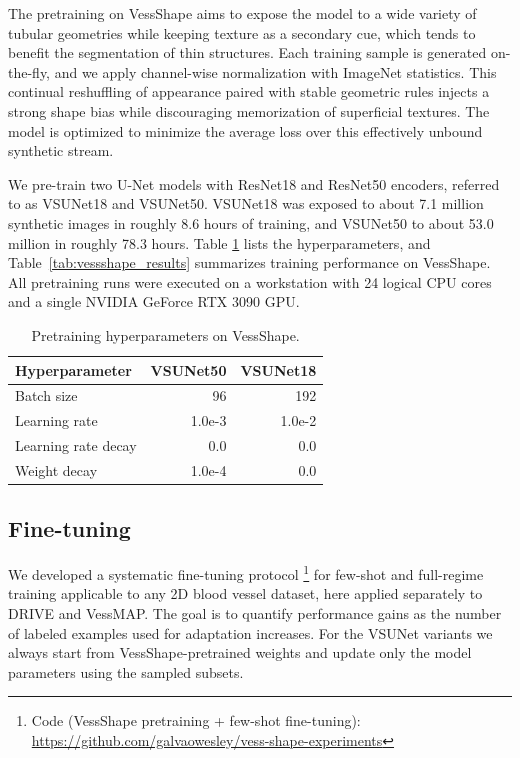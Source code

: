 \documentclass[%
reprint,
nofootinbib,
 amsmath,amssymb,
aps,
superscriptaddress,
showkeys,
longbibliography
]{revtex4-1}
\begin{document}
The pretraining on VessShape aims to expose the model to a wide variety of tubular geometries while keeping texture as a secondary cue, which tends to benefit the segmentation of thin structures. Each training sample is generated on-the-fly, and we apply channel-wise normalization with ImageNet statistics. This continual reshuffling of appearance paired with stable geometric rules injects a strong shape bias while discouraging memorization of superficial textures. The model is optimized to minimize the average loss over this effectively unbound synthetic stream. 

We pre-train two U-Net models with ResNet18 and ResNet50 encoders, referred to as VSUNet18 and VSUNet50. VSUNet18 was exposed to about 7.1 million synthetic images in roughly 8.6 hours of training, and VSUNet50 to about 53.0 million in roughly 78.3 hours. Table \ref{tab:vs_hparams} lists the hyperparameters, and Table~\ref{tab:vessshape_results} summarizes training performance on VessShape. All pretraining runs were executed on a workstation with 24 logical CPU cores and a single NVIDIA GeForce RTX 3090 GPU.

\begin{table}[t]
    \caption{Pretraining hyperparameters on VessShape.}
    \label{tab:vs_hparams}
    \centering
    \begingroup
    \small
    \setlength{\tabcolsep}{6pt}
    \renewcommand{\arraystretch}{1.15}
    \begin{tabular}{l r r}
        \hline
        	\textbf{Hyperparameter} & \textbf{VSUNet50} & \textbf{VSUNet18} \\
        \hline
        Batch size & 96 & 192 \\
        Learning rate & 1.0e-3 & 1.0e-2 \\
        Learning rate decay & 0.0 & 0.0 \\
        Weight decay & 1.0e-4 & 0.0 \\
        \hline
    \end{tabular}
    \endgroup
\end{table}

\subsection{Fine-tuning}

We developed a systematic fine-tuning protocol \footnote{Code (VessShape pretraining + few-shot fine-tuning): \url{https://github.com/galvaowesley/vess-shape-experiments} } for few-shot and full-regime training applicable to any 2D blood vessel dataset, here applied separately to DRIVE and VessMAP. The goal is to quantify performance gains as the number of labeled examples used for adaptation increases. For the VSUNet variants we always start from VessShape-pretrained weights and update only the model parameters using the sampled subsets.
\end{document}
